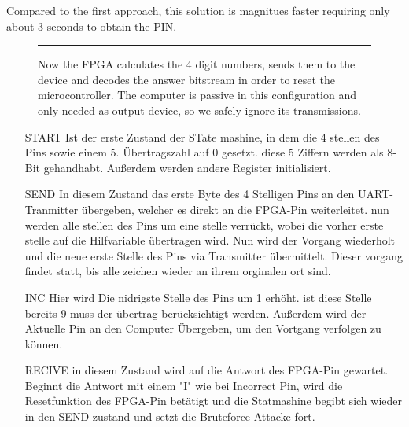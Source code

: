 Compared to the first approach, this solution is magnitues faster requiring only about 3 seconds to obtain the PIN.

\begin{figure}[tb]
    \begin{center}
        
        \caption{Now the FPGA calculates the 4 digit numbers, sends them to the device and decodes the answer bitstream in order to reset the microcontroller. The computer is passive in this configuration and only needed as output device, so we safely ignore its transmissions.}
        \label{fig:as4-schematic-2}
        \vspace{1em}\hrule
    \end{center}
\end{figure}


\begin{itemize}


\item[START] Ist der erste Zustand der STate mashine, in dem die 4 stellen des Pins sowie einem 5. Übertragszahl auf 0 gesetzt. diese 5 Ziffern werden als 8-Bit gehandhabt. Außerdem werden andere Register initialisiert.

\item[SEND] In diesem Zustand das erste Byte des 4 Stelligen Pins an den UART-Tranmitter übergeben, welcher es direkt an die FPGA-Pin weiterleitet. nun werden alle stellen des Pins um eine stelle verrückt, wobei die vorher erste stelle auf die Hilfvariable übertragen wird. Nun wird der Vorgang wiederholt und die neue erste Stelle des Pins via Transmitter übermittelt. Dieser vorgang findet statt, bis alle zeichen wieder an ihrem orginalen ort sind. 

\item[INC] Hier wird Die nidrigste Stelle des Pins um 1 erhöht. ist diese Stelle bereits 9 muss der übertrag berücksichtigt werden. Außerdem wird der Aktuelle Pin an den Computer Übergeben, um den Vortgang verfolgen zu können.

\item[RECIVE] in diesem Zustand wird auf die Antwort des FPGA-Pin gewartet. Beginnt die Antwort mit einem "I" wie bei Incorrect Pin, wird die Resetfunktion des FPGA-Pin betätigt und die Statmashine begibt sich wieder in den SEND zustand und setzt die Bruteforce Attacke fort.

\end{itemize}


